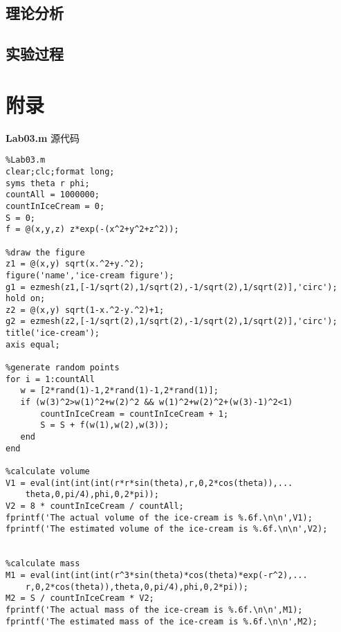 \documentclass[a4paper,12pt]{article}
\begin{document}
\begin{CJK*}{UTF8}{gbsn}
\subsection{理论分析}

\subsection{实验过程}


\section{附录}
\noindent\textbf{Lab03.m} 源代码
\vspace{-10pt}
\lstset{basicstyle=\ttfamily\footnotesize,escapechar=`}
\begin{lstlisting}
%Lab03.m
clear;clc;format long;
syms theta r phi;
countAll = 1000000;
countInIceCream = 0;
S = 0;
f = @(x,y,z) z*exp(-(x^2+y^2+z^2));

%draw the figure
z1 = @(x,y) sqrt(x.^2+y.^2);
figure('name','ice-cream figure');
g1 = ezmesh(z1,[-1/sqrt(2),1/sqrt(2),-1/sqrt(2),1/sqrt(2)],'circ');
hold on;
z2 = @(x,y) sqrt(1-x.^2-y.^2)+1;
g2 = ezmesh(z2,[-1/sqrt(2),1/sqrt(2),-1/sqrt(2),1/sqrt(2)],'circ');
title('ice-cream');
axis equal;

%generate random points
for i = 1:countAll
   w = [2*rand(1)-1,2*rand(1)-1,2*rand(1)];
   if (w(3)^2>w(1)^2+w(2)^2 && w(1)^2+w(2)^2+(w(3)-1)^2<1)
       countInIceCream = countInIceCream + 1;
       S = S + f(w(1),w(2),w(3));
   end
end

%calculate volume
V1 = eval(int(int(int(r*r*sin(theta),r,0,2*cos(theta)),...
    theta,0,pi/4),phi,0,2*pi));
V2 = 8 * countInIceCream / countAll;
fprintf('The actual volume of the ice-cream is %.6f.\n\n',V1);
fprintf('The estimated volume of the ice-cream is %.6f.\n\n',V2);


%calculate mass
M1 = eval(int(int(int(r^3*sin(theta)*cos(theta)*exp(-r^2),...
    r,0,2*cos(theta)),theta,0,pi/4),phi,0,2*pi));
M2 = S / countInIceCream * V2;
fprintf('The actual mass of the ice-cream is %.6f.\n\n',M1);
fprintf('The estimated mass of the ice-cream is %.6f.\n\n',M2);
\end{lstlisting}




\end{CJK*}
\end{document}
